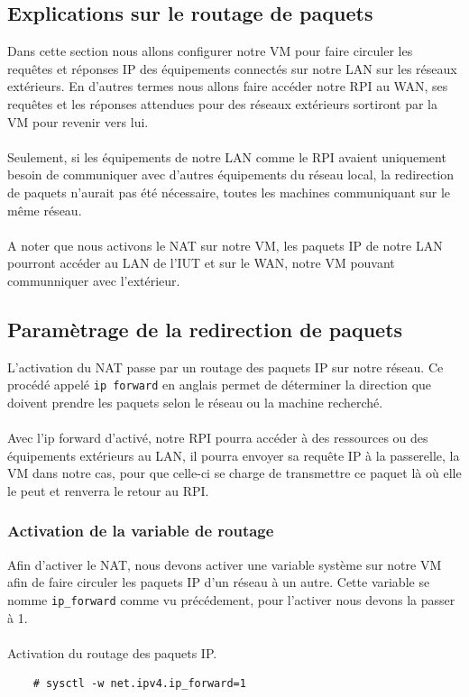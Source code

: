 \documentclass[a4paper]{article}
\begin{document}
\subsection{Explications sur le routage de paquets}
Dans cette section nous allons configurer notre VM pour faire circuler les requêtes et réponses IP des équipements connectés sur notre LAN sur les réseaux extérieurs. En d'autres termes nous allons faire accéder notre RPI au WAN, ses requêtes et les réponses attendues pour des réseaux extérieurs sortiront par la VM pour revenir vers lui.\\\\Seulement, si les équipements de notre LAN comme le RPI avaient uniquement besoin de communiquer avec d'autres équipements du réseau local, la redirection de paquets n'aurait pas été nécessaire, toutes les machines communiquant sur le même réseau.\\\\A noter que nous activons le NAT sur notre VM, les paquets IP de notre LAN pourront accéder au LAN de l'IUT et sur le WAN, notre VM pouvant communniquer avec l'extérieur.
\subsection{Paramètrage de la redirection de paquets}
L'activation du NAT passe par un routage des paquets IP sur notre réseau. Ce procédé appelé \verb|ip forward| en anglais permet de déterminer la direction que doivent prendre les paquets selon le réseau ou la machine recherché.\\\\Avec l'ip forward d'activé, notre RPI pourra accéder à des ressources ou des équipements extérieurs au LAN, il pourra envoyer sa requête IP à la passerelle, la VM dans notre cas, pour que celle-ci se charge de transmettre ce paquet là où elle le peut et renverra le retour au RPI.
\subsubsection{Activation de la variable de routage}
Afin d'activer le NAT, nous devons activer une variable système sur notre VM afin de faire circuler les paquets IP d'un réseau à un autre. Cette variable se nomme \verb|ip_forward| comme vu précédement, pour l'activer nous devons la passer à 1.\\\\Activation du routage des paquets IP.
\begin{lstlisting}
    # sysctl -w net.ipv4.ip_forward=1
\end{lstlisting}
\end{document}

